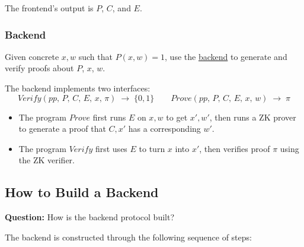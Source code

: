 \documentclass[11pt]{article}
\theoremstyle{plain}
\theoremstyle{definition}
\newcommand{\Prove}{\mathit{Prove}}
\newcommand{\Verify}{\mathit{Verify}}
\begin{document}
The frontend's output is $P$, $C$, and $E$.

\subsubsection*{Backend}

Given concrete $x, w$ such that $P(x, w) = 1$, use the \underline{backend} to generate and verify proofs about $P$, $x$, $w$.

The backend implements two interfaces:
\[
  \Verify(pp,\, P,\, C,\, E,\, x,\, \pi) \;\to\; \{0,1\}
  \qquad
  \Prove(pp,\, P,\, C,\, E,\, x,\, w) \;\to\; \pi
\]

\begin{itemize}
  \item The program $\Prove$ first runs $E$ on $x, w$ to get $x', w'$, then runs a ZK prover to
        generate a proof that $C, x'$ has a corresponding $w'$.
  \item The program $\Verify$ first uses $E$ to turn $x$ into $x'$, then verifies proof $\pi$ using
        the ZK verifier.
\end{itemize}

\subsection{How to Build a Backend}

\begin{tcolorbox}[colback=blue!5!white, colframe=blue!50!black, title={Central Question}]
  \textbf{Question:} How is the backend protocol built?
\end{tcolorbox}

\medskip
The backend is constructed through the following sequence of steps:
\end{document}
